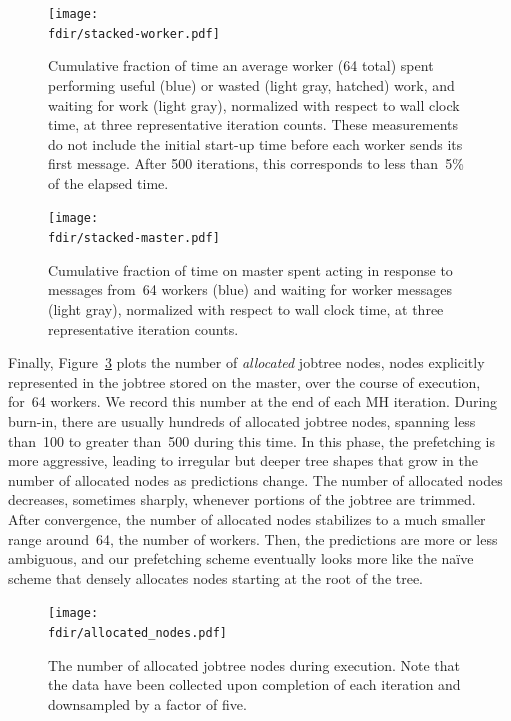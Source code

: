 \documentclass[angelino.tex]{subfiles}
\newcommand{\fdir}{figs/mixture-thesis}
\begin{document}
\begin{figure}[t!]
\begin{center}
\texttt{[image: \\fdir/stacked-worker.pdf]}
\end{center}
\vspace{-0.1in}
\caption{Cumulative fraction of time an average worker (64 total) spent performing
useful (blue) or wasted (light gray, hatched) work, and waiting for work (light gray),
normalized with respect to wall clock time, at three representative iteration counts.
These measurements do not include the initial start-up time before each worker
sends its first \WANTWORK message.
After 500 iterations, this corresponds to less than~5\% of the elapsed time.}
\label{fig:stacked-worker}
\end{figure}
%
\begin{figure}[t!]
\begin{center}
\texttt{[image: \\fdir/stacked-master.pdf]}
\end{center}
\vspace{-0.1in}
\caption{Cumulative fraction of time on master spent acting in response to
messages from~64 workers (blue) and waiting for worker messages (light gray),
normalized with respect to wall clock time, at three representative iteration counts.}
\label{fig:stacked-master}
\end{figure}


Finally, Figure~\ref{fig:allocated-nodes} plots the number of \emph{allocated}
jobtree nodes, \ie nodes explicitly represented in the jobtree stored on the
master, over the course of execution, for~64 workers.
We record this number at the end of each MH iteration.
During burn-in, there are usually hundreds of allocated jobtree nodes,
spanning less than~100 to greater than~500 during this time.
In this phase, the prefetching is more aggressive, leading to irregular but
deeper tree shapes that grow in the number of allocated nodes as predictions change.
The number of allocated nodes decreases, sometimes sharply, whenever portions
of the jobtree are trimmed.
After convergence, the number of allocated nodes stabilizes to a much smaller
range around~64, the number of workers.
Then, the predictions are more or less ambiguous, and our prefetching scheme 
eventually looks more like the na\"ive scheme that densely
allocates nodes starting at the root of the tree.

\begin{figure}[t!]
\centering
\texttt{[image: \\fdir/allocated\_nodes.pdf]}
\caption{The number of allocated jobtree nodes during execution.
Note that the data have been collected upon completion of each iteration
and downsampled by a factor of five.}
\label{fig:allocated-nodes}
\end{figure}
\end{document}
